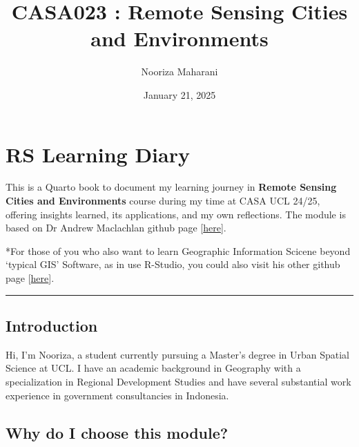 \documentclass[
  letterpaper,
  DIV=11,
  numbers=noendperiod]{scrreprt}
\title{CASA023 : Remote Sensing Cities and Environments}
\author{Nooriza Maharani}
\date{January 21, 2025}
\renewcommand*\contentsname{Table of contents}
\newcommand\contentsname{Table of contents}
\begin{document}
\maketitle
\ifdefined\Shaded\renewenvironment{Shaded}{\begin{tcolorbox}[boxrule=0pt, borderline west={3pt}{0pt}{shadecolor}, interior hidden, frame hidden, breakable, sharp corners, enhanced]}{\end{tcolorbox}}\fi

\renewcommand*\contentsname{Table of contents}
{
\hypersetup{linkcolor=}
\setcounter{tocdepth}{2}
\tableofcontents
}

\hypertarget{rs-learning-diary}{%
\chapter{RS Learning Diary}\label{rs-learning-diary}}

This is a Quarto book to document my learning journey in \textbf{Remote
Sensing Cities and Environments} course during my time at CASA UCL
24/25, offering insights learned, its applications, and my own
reflections. The module is based on Dr Andrew Maclachlan github page
{[}\href{https://andrewmaclachlan.github.io/CASA0023/.}{here}{]}.

*For those of you who also want to learn Geographic Information Scicene
beyond `typical GIS' Software, as in use R-Studio, you could also visit
his other github page
{[}\href{https://andrewmaclachlan.github.io/CASA0005repo/index.html}{here}{]}.

\begin{center}\rule{0.5\linewidth}{0.5pt}\end{center}

\hypertarget{introduction}{%
\section{Introduction}\label{introduction}}

Hi, I'm Nooriza, a student currently pursuing a Master's degree in Urban
Spatial Science at UCL. I have an academic background in Geography with
a specialization in Regional Development Studies and have several
substantial work experience in government consultancies in Indonesia.

\hypertarget{why-do-i-choose-this-module}{%
\section{Why do I choose this
module?}\label{why-do-i-choose-this-module}}
\end{document}
